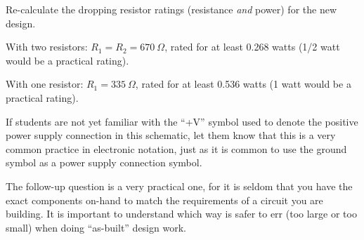 Re-calculate the dropping resistor ratings (resistance {\it and} power) for the new design.







With two resistors: $R_1 = R_2 = 670 \> \Omega$, rated for at least 0.268 watts (1/2 watt would be a practical rating). 

\vskip 10pt

With one resistor: $R_1 = 335 \> \Omega$, rated for at least 0.536 watts (1 watt would be a practical rating). 







If students are not yet familiar with the ``+V'' symbol used to denote the positive power supply connection in this schematic, let them know that this is a very common practice in electronic notation, just as it is common to use the ground symbol as a power supply connection symbol.

The follow-up question is a very practical one, for it is seldom that you have the exact components on-hand to match the requirements of a circuit you are building.  It is important to understand which way is safer to err (too large or too small) when doing ``as-built'' design work.




